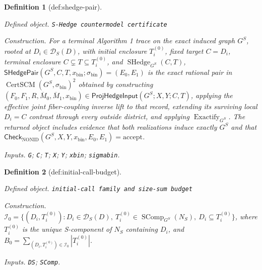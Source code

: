 \documentclass{article}
\newtheorem{definition}{Definition}
\begin{document}
\begin{definition}[def:shedge-pair]\label{def:shedge-pair}
\par\smallskip\noindent\emph{Defined object.} \texttt{S-\allowbreak{}Hedge countermodel certificate}
\par\smallskip\noindent\emph{Construction.} For a terminal Algorithm 1 trace on the exact induced graph \(G^S\), rooted at \(D_i\in\mathcal D_S(D)\), with initial enclosure \(T_i^{(0)}\), fixed target \(C=D_i\), terminal enclosure \(C\subsetneq T\subseteq T_i^{(0)}\), and \(\operatorname{SHedge}_{G^S}(C,T)\), \(\mathsf{SHedgePair}(G^S,C,T,x_{\mathrm{bin}};\sigma_{\mathrm{bin}})=(E_0,E_1)\) is the exact rational pair in \(\operatorname{CertSCM}(G^S,\sigma_{\mathrm{bin}})^2\) obtained by constructing \((F_0,F_1,R,\overline M_0,\overline M_1,x_{\mathrm{bin}})\in\mathsf{ProjHedgeInput}(G^S;X,Y;C,T)\), applying the effective joint fiber-coupling inverse lift to that record, extending its surviving local \(D_i=C\) contrast through every outside district, and applying \(\operatorname{Exactify}_{G^S}\). The returned object includes evidence that both realizations induce exactly \(G^S\) and that \(\mathsf{Check}_{\mathrm{NONID}}(G^S,X,Y,x_{\mathrm{bin}},E_0,E_1)=\mathrm{accept}\).
\par\smallskip\noindent\emph{Inputs.} \texttt{G}; \texttt{C}; \texttt{T}; \texttt{X}; \texttt{Y}; \texttt{xbin}; \texttt{sigmabin}.
\end{definition}

\begin{definition}[def:initial-call-budget]\label{def:initial-call-budget}
\par\smallskip\noindent\emph{Defined object.} \texttt{initial-\allowbreak{}call family and size-\allowbreak{}sum budget}
\par\smallskip\noindent\emph{Construction.} \(\mathcal I_0=\{(D_i,T_i^{(0)}):D_i\in\mathcal D_S(D),\ T_i^{(0)}\in\operatorname{SComp}_{G^S}(N_S),\ D_i\subseteq T_i^{(0)}\}\), where \(T_i^{(0)}\) is the unique S-component of \(N_S\) containing \(D_i\), and \(B_0=\sum_{(D_i,T_i^{(0)})\in\mathcal I_0}|T_i^{(0)}|\).
\par\smallskip\noindent\emph{Inputs.} \texttt{DS}; \texttt{SComp}.
\end{definition}
\end{document}
